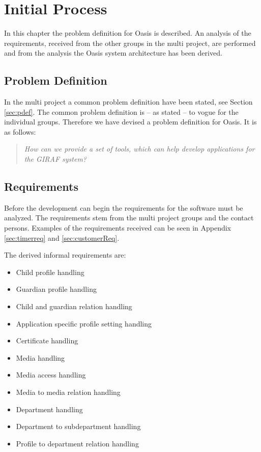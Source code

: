\chapter{Initial Process}
In this chapter the problem definition for Oasis is described.
An analysis of the requirements, received from the other groups in the multi project, are performed and from the analysis the Oasis system architecture has been derived.

\section{Problem Definition}
\label{sec:OasisProblemDefinition}
In the multi project a common problem definition have been stated, see Section \vref{sec:pdef}. The common problem definition is -- as stated -- to vogue for the individual groups. Therefore we have devised a problem definition for Oasis.
It is as follows:

\begin{quotation}
	\textit{How can we provide a set of tools, which can help develop applications for the GIRAF system?}
\end{quotation}

\section{Requirements}
Before the development can begin the requirements for the software must be analyzed.
The requirements stem from the multi project groups and the contact persons.
Examples of the requirements received can be seen in Appendix \vref{sec:timerreq} and \vref{sec:customerReq}.

The derived informal requirements are:
\begin{itemize}
	\item Child profile handling
	\item Guardian profile handling
	\item Child and guardian relation handling
	\item Application specific profile setting handling
	\item Certificate handling
	\item Media handling
	\item Media access handling
	\item Media to media relation handling
	\item Department handling
	\item Department to subdepartment handling
	\item Profile to department relation handling
\end{itemize}

